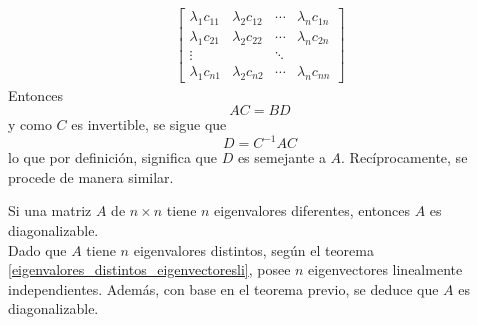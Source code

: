 \begin{theorem}
\begin{align*}
\begin{bmatrix}
            \lambda_1c_{11} & \lambda_2c_{12} & \cdots & \lambda_nc_{1n} \\
            \lambda_1c_{21} & \lambda_2c_{22} & \cdots & \lambda_nc_{2n} \\
            \vdots & & \ddots & \\
            \lambda_1c_{n1} & \lambda_2c_{n2} & \cdots & \lambda_nc_{nn}
        \end{bmatrix}
    \end{align*}
    Entonces
    $$AC = BD$$
    y como $C$ es invertible, se sigue que
    $$D = C^{-1}AC$$
    lo que por definición, significa que $D$ es semejante a $A$. Recíprocamente, se procede de manera similar.
\end{theorem}

\begin{theorem}
    Si una matriz $A$ de $n \times n$ tiene $n$ eigenvalores diferentes, entonces $A$ es diagonalizable. \\
    \demostracion Dado que $A$ tiene $n$ eigenvalores distintos, según el teorema \ref{eigenvalores_distintos_eigenvectoresli}, posee $n$ eigenvectores linealmente independientes. Además, con base en el teorema previo, se deduce que $A$ es diagonalizable.
\end{theorem}

